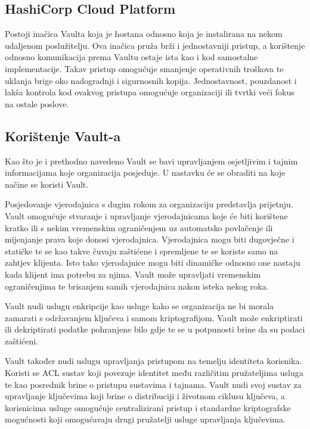 \documentclass[]{foi}
\begin{document}
\subsection{HashiCorp Cloud Platform}

Postoji inačica Vaulta koja je hostana odnosno koja je instalirana na nekom udaljenom poslužitelju.
Ova inačica pruža brži i jednostavniji pristup, a korištenje odnosno komunikacija prema Vaultu ostaje ista kao i kod samostalne implementacije.
Takav pristup omogućuje smanjenje operativnih troškova te uklanja brige oko nadogradnji i sigurnosnih kopija.
Jednostavnost, pouzdanost i lakša kontrola kod ovakvog pristupa omogućuje organizaciji ili tvrtki veći fokus na ostale poslove.


\subsection{Korištenje Vault-a}

Kao što je i prethodno navedeno Vault se bavi upravljanjem osjetljivim i tajnim informacijama koje organizacija posjeduje.
U nastavku će se obraditi na koje načine se koristi Vault.

Posjedovanje vjerodajnica s dugim rokom za organizaciju predstavlja prijetnju.
Vault omogućuje stvaranje i upravljanje vjerodajnicama koje će biti korištene kratko ili s nekim vremenskim ograničenjem uz automatsko povlačenje ili mijenjanje prava koje donosi vjerodajnica.
Vjerodajnica mogu biti dugovječne i statičke te se kao takve čuvaju zaštićene i spremljene te se koriste samo na zahtjev klijenta.
Isto tako vjerodajnice mogu biti dinamičke odnosno one nastaju kada klijent ima potrebu za njima.
Vault može upravljati vremenskim ograničenjima te brisanjem samih vjerodajnica nakon isteka nekog roka.

Vault nudi uslugu enkripcije kao usluge kako se organizacija ne bi morala zamarati s održavanjem ključeva i samom kriptografijom.
Vault može enkriptirati ili dekriptirati podatke pohranjene bilo gdje te se u potpunosti brine da su podaci zaštićeni.

Vault također nudi uslugu upravljanja pristupom na temelju identiteta korisnika.
Koristi se ACL sustav koji povezuje identitet među različitim pružateljima usluga te kao posrednik brine o pristupu sustavima i tajnama. Vault nudi svoj sustav za upravljanje ključevima koji brine o distribuciji i životnom ciklusu ključeva, a korisnicima usluge omogućuje centralizirani pristup i standardne kriptografske mogućnosti koji omogućavaju drugi pružatelji usluge upravljanja ključevima. \cite{hashicorp-vault-use-cases}
\end{document}
